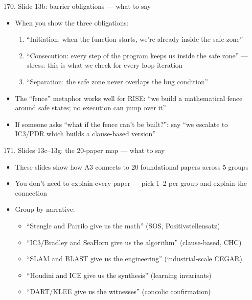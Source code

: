 \documentclass[aspectratio=169]{beamer}
\begin{document}
\begin{frame}{170. Slide 13b: barrier obligations --- what to say}
\begin{itemize}
  \item When you show the three obligations:
    \begin{enumerate}
      \item ``Initiation: when the function starts, we're already inside the safe zone''
      \item ``Consecution: every step of the program keeps us inside the safe zone'' --- stress: this is what we check for every loop iteration
      \item ``Separation: the safe zone never overlaps the bug condition''
    \end{enumerate}
  \item The ``fence'' metaphor works well for RISE: ``we build a mathematical fence around safe states; no execution can jump over it''
  \item If someone asks ``what if the fence can't be built?'': say ``we escalate to IC3/PDR which builds a clause-based version''
\end{itemize}
\end{frame}

\begin{frame}{171. Slides 13c--13g: the 20-paper map --- what to say}
\begin{itemize}
  \item These slides show how A3 connects to 20 foundational papers across 5 groups
  \item You don't need to explain every paper --- pick 1--2 per group and explain the connection
  \item Group by narrative:
    \begin{itemize}
      \item ``Stengle and Parrilo give us the math'' (SOS, Positivstellensatz)
      \item ``IC3/Bradley and SeaHorn give us the algorithm'' (clause-based, CHC)
      \item ``SLAM and BLAST give us the engineering'' (industrial-scale CEGAR)
      \item ``Houdini and ICE give us the synthesis'' (learning invariants)
      \item ``DART/KLEE give us the witnesses'' (concolic confirmation)
    \end{itemize}
\end{itemize}
\end{frame}
\end{document}
